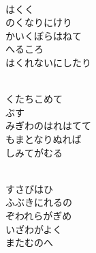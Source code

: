 \documentclass[10pt,b5j]{tarticle} %
\begin{document}
\begin{enumerate}
\begin{minipage}[c]{\blocksize}
        \vspace{\linespace}
        \item~\\
        はくく\\
        のくなりにけり\\
        かいくぼらはねて\\
        へるころ\\
        はくれないにしたり
        
        \vspace{\linespace}
        \item~\\
        くたちこめて\\
        ぶす\\
        みぎわのはれはてて\\
        もまとなりぬれば\\
        しみてがむる
        
        \vspace{\linespace}
        \item~\\
        すさびはひ\\
        ふぶきにれるの\\
        ぞわれらがぎめ\\
        いざわがよく\\
        またむのへ
    
    \end{minipage}
\end{enumerate} %
\end{document}
